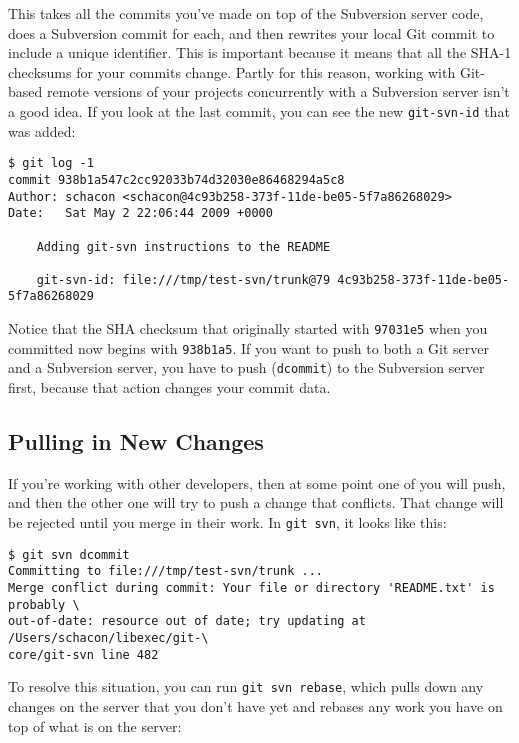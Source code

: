 \documentclass[a4paper]{book}
\begin{document}
This takes all the commits you've made on top of the Subversion server code, does a Subversion commit for each, and then rewrites your local Git commit to include a unique identifier. This is important because it means that all the SHA-1 checksums for your commits change. Partly for this reason, working with Git-based remote versions of your projects concurrently with a Subversion server isn't a good idea. If you look at the last commit, you can see the new \texttt{git-svn-id} that was added:

\begin{shaded}\begin{verbatim}
$ git log -1
commit 938b1a547c2cc92033b74d32030e86468294a5c8
Author: schacon <schacon@4c93b258-373f-11de-be05-5f7a86268029>
Date:   Sat May 2 22:06:44 2009 +0000

    Adding git-svn instructions to the README

    git-svn-id: file:///tmp/test-svn/trunk@79 4c93b258-373f-11de-be05-5f7a86268029
\end{verbatim}\end{shaded}

Notice that the SHA checksum that originally started with \texttt{97031e5} when you committed now begins with \texttt{938b1a5}. If you want to push to both a Git server and a Subversion server, you have to push (\texttt{dcommit}) to the Subversion server first, because that action changes your commit data.

\subsection{Pulling in New Changes}\label{pulling-in-new-changes}

If you're working with other developers, then at some point one of you will push, and then the other one will try to push a change that conflicts. That change will be rejected until you merge in their work. In \texttt{git svn}, it looks like this:

\begin{shaded}\begin{verbatim}
$ git svn dcommit
Committing to file:///tmp/test-svn/trunk ...
Merge conflict during commit: Your file or directory 'README.txt' is probably \
out-of-date: resource out of date; try updating at /Users/schacon/libexec/git-\
core/git-svn line 482
\end{verbatim}\end{shaded}

To resolve this situation, you can run \texttt{git svn rebase}, which pulls down any changes on the server that you don't have yet and rebases any work you have on top of what is on the server:
\end{document}

